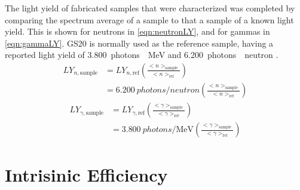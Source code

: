 The light yield of fabricated samples that were characterized was completed by comparing the spectrum average of a sample to that a sample of a known light yield.
This is shown for neutrons in \eqref{eqn:neutronLY}, and for gammas in \eqref{eqn:gammaLY}.
GS20 is normally used as the reference sample, having a reported light yield of \SI{3,800}{photons \per\MeV} and \SI{6,200}{photons \per neutron} \cite{carel_w.e_inorganic-scintillator_2001,knoll_radiation_2009}.
\begin{align}
	LY_{n,\text{sample}} &= LY_{n,\text{ref}} \left( \frac{<n>_\text{sample}}{<n>_\text{ref} } \right )\\
	&= \SI{6,200}{photons\per neutron} \left( \frac{<n>_\text{sample}}{<n>_\text{ref} } \right )
	\label{eqn:neutronLY}
\end{align}
\begin{align}
	LY_{\gamma,\text{sample}} &= LY_{\gamma,\text{ref}} \left( \frac{<\gamma>_\text{sample}}{<\gamma>_\text{ref} } \right )\\
	&= \SI{3,800}{photons\per\MeV} \left( \frac{<\gamma>_\text{sample}}{<\gamma>_\text{ref} } \right )
	\label{eqn:gammaLY}
\end{align}

\section{Intrisinic Efficiency}
\label{sec:IntEff}
